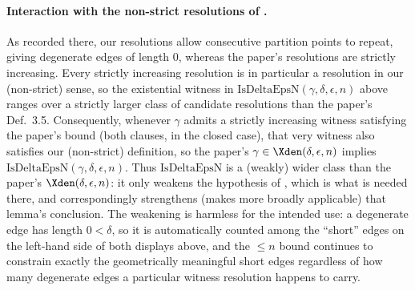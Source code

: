 \begin{definition}
  \paragraph{Interaction with the non-strict resolutions of .} As
  recorded there, our resolutions allow consecutive partition points to repeat, giving degenerate
  edges of length $0$, whereas the paper's resolutions are strictly increasing. Every strictly
  increasing resolution is in particular a resolution in our (non-strict) sense, so the existential
  witness in $\mathrm{IsDeltaEpsN}(\gamma,\delta,\epsilon,n)$ above ranges over a strictly larger
  class of candidate resolutions than the paper's Def.~3.5. Consequently, whenever $\gamma$ admits
  a strictly increasing witness satisfying the paper's bound (both clauses, in the closed case),
  that very witness also satisfies our (non-strict) definition, so the paper's $\gamma \in
  \Xden(\delta,\epsilon,n)$ implies $\mathrm{IsDeltaEpsN}(\gamma,\delta,\epsilon,n)$. Thus
  $\mathrm{IsDeltaEpsN}$ is a (weakly) wider class than the paper's $\Xden(\delta,\epsilon,n)$: it
  only weakens the hypothesis of , which is what is needed there, and
  correspondingly strengthens (makes more broadly applicable) that lemma's conclusion. The
  weakening is harmless for the intended use: a degenerate edge has length $0 < \delta$, so it is
  automatically counted among the ``short'' edges on the left-hand side of both displays above,
  and the $\leq n$ bound continues to constrain exactly the geometrically meaningful short edges
  regardless of how many degenerate edges a particular witness resolution happens to carry.
\end{definition}
